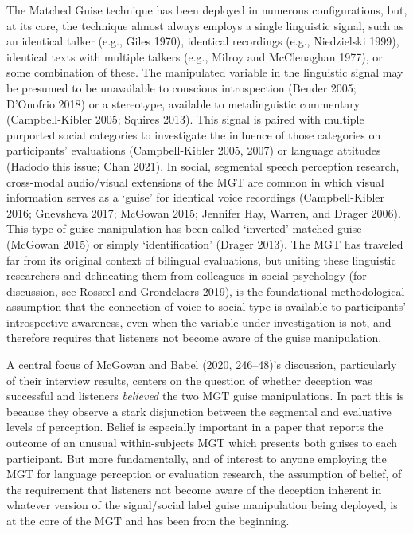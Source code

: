 \documentclass[
  letterpaper,
  DIV=11,
  numbers=noendperiod]{scrartcl}
\begin{document}
The Matched Guise technique has been deployed in numerous
configurations, but, at its core, the technique almost always employs a
single linguistic signal, such as an identical talker (e.g., Giles
1970), identical recordings (e.g., Niedzielski 1999), identical texts
with multiple talkers (e.g., Milroy and McClenaghan 1977), or some
combination of these. The manipulated variable in the linguistic signal
may be presumed to be unavailable to conscious introspection (Bender
2005; D'Onofrio 2018) or a stereotype, available to metalinguistic
commentary (Campbell-Kibler 2005; Squires 2013). This signal is paired
with multiple purported social categories to investigate the influence
of those categories on participants' evaluations (Campbell-Kibler 2005,
2007) or language attitudes (Hadodo this issue; Chan 2021). In social,
segmental speech perception research, cross-modal audio/visual
extensions of the MGT are common in which visual information serves as a
`guise' for identical voice recordings (Campbell-Kibler 2016; Gnevsheva
2017; McGowan 2015; Jennifer Hay, Warren, and Drager 2006). This type of
guise manipulation has been called `inverted' matched guise (McGowan
2015) or simply `identification' (Drager 2013). The MGT has traveled far
from its original context of bilingual evaluations, but uniting these
linguistic researchers and delineating them from colleagues in social
psychology (for discussion, see Rosseel and Grondelaers 2019), is the
foundational methodological assumption that the connection of voice to
social type is available to participants' introspective awareness, even
when the variable under investigation is not, and therefore requires
that listeners not become aware of the guise manipulation.

A central focus of McGowan and Babel (2020, 246--48)'s discussion,
particularly of their interview results, centers on the question of
whether deception was successful and listeners \emph{believed} the two
MGT guise manipulations. In part this is because they observe a stark
disjunction between the segmental and evaluative levels of perception.
Belief is especially important in a paper that reports the outcome of an
unusual within-subjects MGT which presents both guises to each
participant. But more fundamentally, and of interest to anyone employing
the MGT for language perception or evaluation research, the assumption
of belief, of the requirement that listeners not become aware of the
deception inherent in whatever version of the signal/social label guise
manipulation being deployed, is at the core of the MGT and has been from
the beginning.
\end{document}
